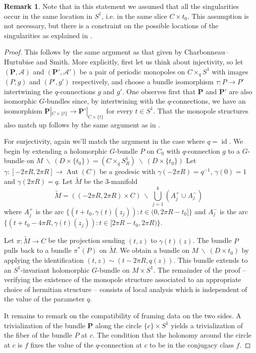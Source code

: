 \documentclass[11pt, oneside, reqno]{amsart}
\theoremstyle{definition} \newtheorem{definition}{Definition}[section]
\theoremstyle{definition} \newtheorem{remark}[definition]{Remark}
\theoremstyle{definition} \newtheorem{remarks}[definition]{Remarks}
\theoremstyle{definition} \newtheorem{question}[definition]{Question}
\theoremstyle{definition} \newtheorem*{note}{Note}
\theoremstyle{definition} \newtheorem{example}[definition]{Example}
\theoremstyle{definition} \newtheorem{examples}[definition]{Examples}
\newcommand{\mc}[1]{\mathcal{#1}}
\newcommand{\wt}[1]{\widetilde{#1}}
\newcommand{\bo}[1]{\boldsymbol{#1}}
\newcommand{\bs}{\ \backslash \ }
\DeclareMathOperator{\id}{id}
\DeclareMathOperator{\aut}{Aut}
\begin{document}
\begin{remark}
Note that in this statement we assumed that all the singularities occur in the same location in $S^1$, i.e. in the same slice $C \times {t_0}$.  This assumption is not necessary, but there is a constraint on the possible locations of the singularities as explained in \cite[Proposition 3.5]{CharbonneauHurtubise}.  
\end{remark}

\begin{proof}
This follows by the same argument as that given by Charbonneau--Hurtubise and Smith.  More explicitly, first let us think about injectivity, so let $(\bo P, \mc A)$ and $(\bo P', \mc A')$ be a pair of periodic monopoles on $C \times_q S^1$ with images $(P,g)$ and $(P', g')$ respectively, and choose a bundle isomorphism $\tau \colon P \to P'$ intertwining the $q$-connections $g$ and $g'$.  One observes first that $\bo P$ and $\bo P'$ are also isomorphic $G$-bundles since, by intertwining with the $q$-connections, we have an isomorphism $\bo P|_{C \times \{t\}} \to \bo P'|_{C \times \{t\}}$ for every $t \in S^1$.  That the monopole structures also match up follows by the same argument as in \cite[Proposition 4.7]{CharbonneauHurtubise}.

For surjectivity, again we'll match the argument in the case where $q=\id$.  We begin by extending a holomorphic $G$-bundle $P$ on $C_0$ with $q$-connection $g$ to a $G$-bundle on $M \bs (D \times \{t_0\}) = (C \times_q S^1_R) \bs (D \times \{t_0\})$  Let $\gamma \colon [-2\pi R,2\pi R] \to \aut(C)$ be a geodesic with $\gamma(-2\pi R) = q^{-1}$, $\gamma(0)=1$ and $\gamma(2\pi R) = q$.  Let $\wt M$ be the 3-manifold
\[\wt M = ((-2\pi R, 2\pi R) \times C) \bs \bigcup_{j=1}^k (A^+_j \cup A^-_j)\]
where $A^+_j$ is the arc $\{(t+ t_0,\gamma(t)(z_j)) \colon t \in (0, 2\pi R - t_0]\}$ and $A^-_j$ is the arc $\{(t + t_0 - 4 \pi R,\gamma(t)(z_j)) \colon t \in [2\pi R-t_0, 2 \pi R)\}$.

Let $\pi \colon \wt M \to C$ be the projection sending $(t,z)$ to $\gamma(t)(z)$.  The bundle $P$ pulls back to a bundle $\pi^*(P)$ on $\wt M$.  We obtain a bundle on $M \bs (D \times t_0)$ by applying the identification $(t,z) \sim (t - 2 \pi R, q(z))$.  This bundle extends to an $S^1$-invariant holomorphic $G$-bundle on $M \times S^1$.  The remainder of the proof -- verifying the existence of the monopole structure associated to an appropriate choice of hermitian structure -- consists of local analysis which is independent of the value of the parameter $q$. 

It remains to remark on the compatibility of framing data on the two sides.  A trivialization of the bundle $\bo P$ along the circle $\{c\} \times S^1$ yields a trivialization of the fiber of the bundle $P$ at $c$.  The condition that the holonomy around the circle at $c$ is $f$ fixes the value of the $q$-connection at $c$ to be in the conjugacy class $f$.
\end{proof}
\end{document}
